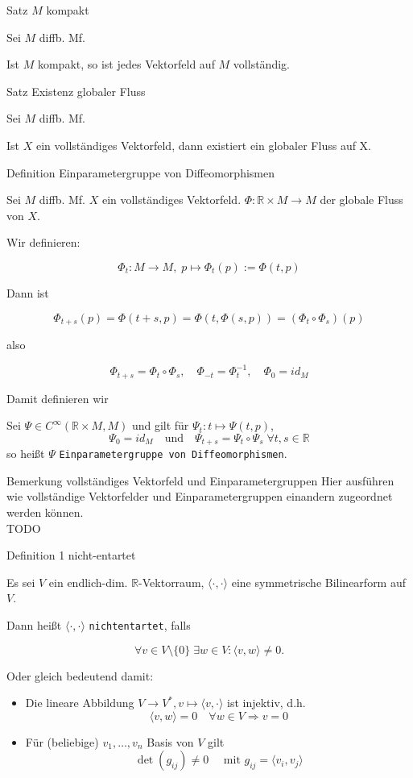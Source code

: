 \documentclass[a6paper,11pt,grid=front]{kartei}
\newcommand{\fl}[1]{\begin{flushleft}
 #1 \end{flushleft}}
\newcommand{\R}{\mathbb{R}}
\newcommand{\blf}[1]{\langle #1 \rangle}
\newcounter{def}
\begin{document}
\nonameyet
{Satz} {$M$ kompakt}
{
Sei $M$ diffb. Mf.

\fl{Ist $M$ kompakt, so ist jedes Vektorfeld auf $M$ vollständig.}
}
{}

\nonameyet
{Satz} {Existenz globaler Fluss}
{
Sei $M$ diffb. Mf.
\fl{Ist $X$ ein vollständiges Vektorfeld, dann existiert ein globaler Fluss
		auf X.}
}
{}

\nonameyet
{Definition} {\small Einparametergruppe von Diffeomorphismen}
{
\tiny
Sei $M$ diffb. Mf. $X$ ein vollständiges Vektorfeld. 
$\Phi: \R \times M \to M$ der globale Fluss von $X$. 
\scriptsize
%
\fl{Wir definieren:}
\vspace{-1em}
\[
\Phi_t : M \to M, \; p \mapsto \Phi_t(p) := \Phi(t,p)
\]
%
\fl{Dann ist}
\vspace{-1em}
\[
\Phi_{t+s}(p) = \Phi(t+s,p) = \Phi(t,\Phi(s,p)) = (\Phi_t \circ \Phi_s)(p)
\]
%
\fl{also}
\vspace{-1em}
\[
\Phi_{t+s} = \Phi_t \circ \Phi_s 
,\quad 
\Phi_{-t} = \Phi^{-1}_t
, \quad 
\Phi_0 = id_M
\]
\fl{Damit definieren wir}
%
\small
Sei $\Psi \in C^\infty(\R \times M, M)$ und gilt für 
$\Psi_t: t\mapsto \Psi(t,p)$, 
\[
\Psi_0 = id_M 
\quad \text{und} \quad
\Psi_{t+s} = \Psi_t\circ \Psi_s \; \forall t,s \in \R
\]
%
so heißt $\Psi$ \texttt{Einparametergruppe von 
Diffeomorphismen}.
}
{}

\nonameyet
{\tiny Bemerkung} {\tiny vollständiges Vektorfeld und Einparametergruppen}
{
Hier ausführen wie vollständige Vektorfelder und Einparametergruppen
einandern zugeordnet werden können.
\\
TODO
}
{}


\nonameyet
{Definition 1} {nicht-entartet}
{
	\small
Es sei $V$ ein endlich-dim. $\R$-Vektorraum, $\blf{\cdot,\cdot}$ eine 
symmetrische Bilinearform auf $V$.
\fl{Dann heißt $\blf{\cdot,\cdot}$ \texttt{nichtentartet}, falls}
\[
\forall v\in V\setminus\{0\} \; \exists w\in V: \blf{v,w} \neq 0.
\]
\fl{Oder gleich bedeutend damit:}
\begin{itemize}[-]
\item%
Die lineare Abbildung $V \to V^*, v \mapsto \blf{v,\cdot}$ ist injektiv, d.h.
\[
\blf{v,w} = 0 \quad \forall w\in V \Rightarrow v = 0
\] 
\item%
Für (beliebige) $v_1,\dots,v_n$ Basis von $V$ gilt
\[
\det(g_{ij}) \neq 0 \quad \text{ mit } g_{ij} = \blf{v_i,v_j} 
\]
\end{itemize}
}
{}
\end{document}
